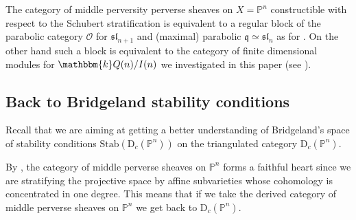 \documentclass[11pt]{amsart}
\theoremstyle{definition}
\newcommand{\kk}{\mathbbm{k}}
\newcommand{\PP}{\mathbb{P}}
\newcommand{\cat}[1]{\mathrm{#1}}
\newcommand{\constr}[2]{\cat{D}_{#1}({#2})}
\newcommand{\stab}[1]{\mathrm{Stab}(#1)}
\begin{document}
The category of middle perversity perverse sheaves on $X=\PP^n$ constructible with respect to the Schubert stratification is equivalent to a regular block of the parabolic category $\mathcal{O}$ for $\mathfrak{sl}_{n+1}$ and (maximal) parabolic $\mathfrak{q}\simeq \mathfrak{sl}_{n}$ as for \cite[Proposition 3.5.1]{MR1322847}. On the other hand such a block is equivalent to  the category of finite dimensional modules for 
$\kk Q(n)/I(n)$ we investigated in this paper (see \cite[Example 1.1]{stroppelTQFT}).

\subsection{Back to Bridgeland stability conditions}



Recall that we are aiming at getting a better understanding of  Bridgeland's space of stability conditions $\stab{\constr{c}{\PP^n}}$ on the triangulated category $\constr{c}{\PP^n}$. 

By \cite[\S1.5]{MR2119139}, the category of middle perverse sheaves on $\PP^n$ forms a faithful heart since we are stratifying the projective space by affine subvarieties whose cohomology is concentrated in one degree. This means that if we take the derived category of middle perverse sheaves on $\PP^n$ we get back to $\constr{c}{\PP^n}$.
\end{document}
